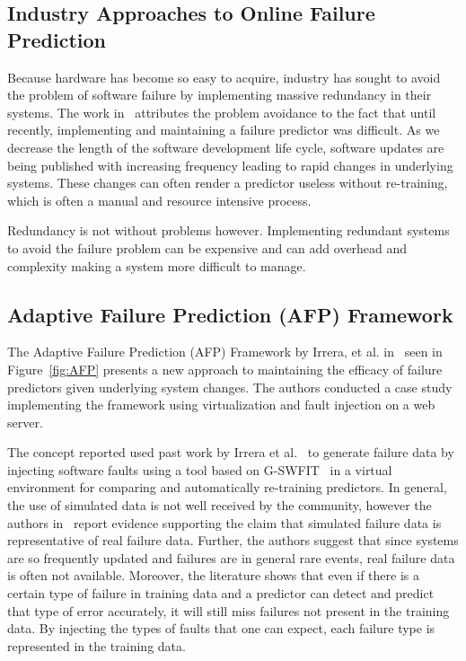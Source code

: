 \subsection{Industry Approaches to Online Failure Prediction} \label{industry}
Because hardware has become so easy to acquire, industry has sought to avoid
the problem of software failure by implementing massive redundancy in their
systems.  The work in~\cite{watanabe2014,irrera2015} attributes the problem
avoidance to the fact that until recently, implementing and maintaining a
failure predictor was difficult.  As we decrease the length of the software
development life cycle, software updates are being published with increasing
frequency leading to rapid changes in underlying systems.  These changes can
often render a predictor useless without re-training, which is often a manual
and resource intensive process.

Redundancy is not without problems however.  Implementing redundant systems to
avoid the failure problem can be expensive and can add overhead and complexity
making a system more difficult to manage.

\subsection{Adaptive Failure Prediction (AFP) Framework} \label{afp}
The Adaptive Failure Prediction (AFP) Framework by Irrera, et al.
in~\cite{irrera2015} seen in Figure~\ref{fig:AFP} presents a new approach to
maintaining the efficacy of failure predictors given underlying system changes.
The authors conducted a case study implementing the framework using
virtualization and fault injection on a web server.  

\figAFP

The concept reported used past work by Irrera et
al.~\cite{irrera2013,irrera2014} to generate failure data by injecting software
faults using a tool based on G-SWFIT~\cite{gswfit} in a virtual environment for
comparing and automatically re-training predictors.  In general, the use of
simulated data is not well received by the community, however the authors
in~\cite{irrera2010,irrera2014} report evidence supporting the claim that
simulated failure data is representative of real failure data.  Further, the
authors suggest that since systems are so frequently updated and failures are
in general rare events, real failure data is often not available.  Moreover,
the literature shows that even if there is a certain type of failure in
training data and a predictor can detect and predict that type of error
accurately, it will still miss failures not present in the training data.  By
injecting the types of faults that one can expect, each failure type is
represented in the training data.

